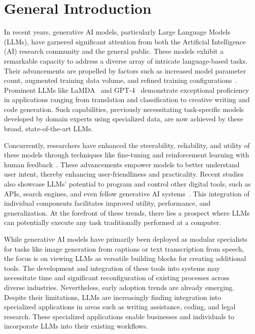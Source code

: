 \documentclass[a4paper,oneside]{book}
\begin{document}
\section{General Introduction}
In recent years, generative AI models, particularly Large Language Models (LLMs), have garnered significant attention from both the Artificial Intelligence (AI) research community and the general public. These models exhibit a remarkable capacity to address a diverse array of intricate language-based tasks. Their advancements are propelled by factors such as increased model parameter count, augmented training data volume, and refined training configurations~\cite{brown2020language, radford2019language, hernandez2021scaling, kaplan2020scaling}. Prominent LLMs like LaMDA~\cite{thoppilan2022lamda} and GPT-4~\cite{openai2023gpt4} demonstrate exceptional proficiency in applications ranging from translation and classification to creative writing and code generation. Such capabilities, previously necessitating task-specific models developed by domain experts using specialized data, are now achieved by these broad, state-of-the-art LLMs.

Concurrently, researchers have enhanced the steerability, reliability, and utility of these models through techniques like fine-tuning and reinforcement learning with human feedback~\cite{ouyang2022training, bai2022training}. These advancements empower models to better understand user intent, thereby enhancing user-friendliness and practicality. Recent studies also showcase LLMs' potential to program and control other digital tools, such as APIs, search engines, and even fellow generative AI systems~\cite{schick2023toolformer, mialon2023augmented}. This integration of individual components facilitates improved utility, performance, and generalization. At the forefront of these trends, there lies a prospect where LLMs can potentially execute any task traditionally performed at a computer.

While generative AI models have primarily been deployed as modular specialists for tasks like image generation from captions or text transcription from speech, the focus is on viewing LLMs as versatile building blocks for creating additional tools. The development and integration of these tools into systems may necessitate time and significant reconfiguration of existing processes across diverse industries. Nevertheless, early adoption trends are already emerging. Despite their limitations, LLMs are increasingly finding integration into specialized applications in areas such as writing assistance, coding, and legal research. These specialized applications enable businesses and individuals to incorporate LLMs into their existing workflows.
\end{document}
